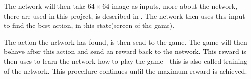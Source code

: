 The network will then take $64 \times 64 $ image as inputs, more about the network, there are used in this project, is described in . The network then uses this input to find the best action, in this state(screen of the game).

The action the network has found, is then send to the game. The game will then behave after this action and send an reward back to the network. This reward is then uses to learn the network how to play the game - this is also called training of the network. This procedure continues until the maximum reward is achieved.   
 

 

 
   
